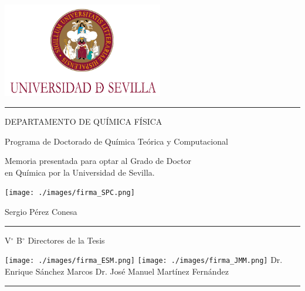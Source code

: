 \documentclass[b5paper,11pt,twoside,showtrims,openright]{memoir} %
\begin{document}
\begin{center}
\includegraphics[width=7cm]{./images/logotipo.jpeg}
\rule{\textwidth}{1.2pt}
DEPARTAMENTO DE QUÍMICA FÍSICA
\par
Programa de Doctorado de Química Teórica y Computacional
\vspace*{0.5cm}

Memoria presentada para optar al Grado de Doctor\\
 en Química por la Universidad de Sevilla.
\vspace*{0.3cm} %
\begin{center}
\texttt{[image: ./images/firma\_SPC.png]}
\end{center}
Sergio Pérez Conesa
\rule{\textwidth}{1.2pt}
\vspace*{0.4cm}%
V$^\circ$ B$^\circ$ Directores de la Tesis
\par
\vspace*{0.5cm}
\texttt{[image: ./images/firma\_ESM.png]}
\hspace*{3.5cm}
\texttt{[image: ./images/firma\_JMM.png]}
\newline
Dr. Enrique Sánchez Marcos \hfill Dr. José Manuel Martínez Fernández
\rule{\textwidth}{1.2pt}
\end{center}
\end{document}
